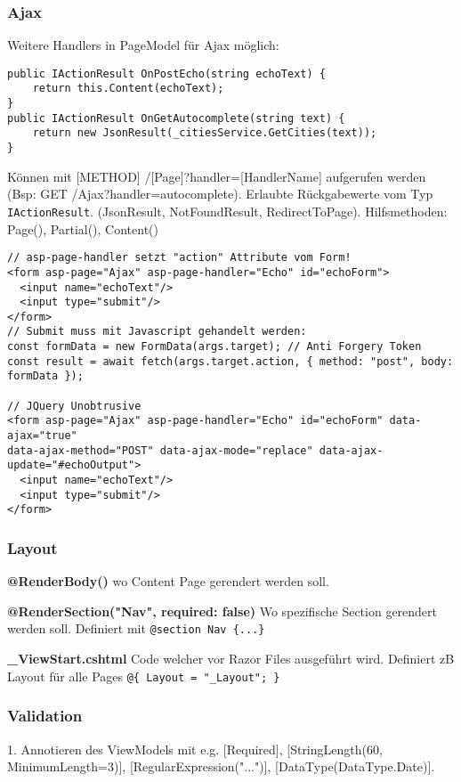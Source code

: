 \begin{multicols*}{2}
\subsubsection{Ajax}

Weitere Handlers in PageModel für Ajax möglich:
\begin{verbatim}
public IActionResult OnPostEcho(string echoText) {
    return this.Content(echoText);
}
public IActionResult OnGetAutocomplete(string text) {
    return new JsonResult(_citiesService.GetCities(text));
}
\end{verbatim}
Können mit [METHOD] /[Page]?handler=[HandlerName] aufgerufen werden (Bsp: GET /Ajax?handler=autocomplete).
Erlaubte Rückgabewerte vom Typ \lstinline|IActionResult|. (JsonResult, NotFoundResult, RedirectToPage). Hilfsmethoden: Page(), Partial(), Content()



\begin{verbatim}
// asp-page-handler setzt "action" Attribute vom Form!
<form asp-page="Ajax" asp-page-handler="Echo" id="echoForm">
  <input name="echoText"/>
  <input type="submit"/>
</form>
// Submit muss mit Javascript gehandelt werden:
const formData = new FormData(args.target); // Anti Forgery Token
const result = await fetch(args.target.action, { method: "post", body: formData });

// JQuery Unobtrusive
<form asp-page="Ajax" asp-page-handler="Echo" id="echoForm" data-ajax="true"
data-ajax-method="POST" data-ajax-mode="replace" data-ajax-update="#echoOutput">
  <input name="echoText"/>
  <input type="submit"/>
</form>
\end{verbatim}

\subsubsection{Layout}
\textbf{@RenderBody()} wo Content Page gerendert werden soll.

\textbf{@RenderSection("Nav", required: false)} Wo spezifische Section gerendert werden soll. Definiert mit \lstinline|@section Nav {...}|

\textbf{\_ViewStart.cshtml} Code welcher vor Razor Files ausgeführt wird. Definiert zB Layout für alle Pages \lstinline|@{ Layout = "_Layout"; }|

\subsubsection{Validation}
1. Annotieren des ViewModels mit e.g. [Required], [StringLength(60, MinimumLength=3)], [RegularExpression("...")], [DataType(DataType.Date)].


\end{multicols*}
